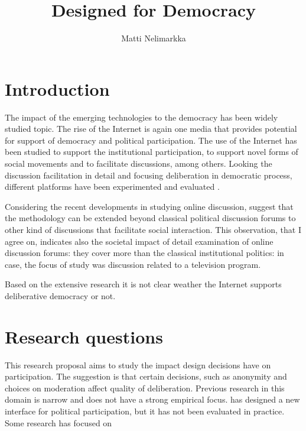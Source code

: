 \documentclass[journal,a4paper]{IEEEtran}
\author{Matti Nelimarkka}
\title{Designed for Democracy}
\begin{document}
\maketitle

\setlength{\parindent}{0pt}
\setlength{\parskip}{1ex}


\section{Introduction}

The impact of the emerging technologies to the democracy has been widely studied topic. The rise of the Internet is again one media that provides potential for support of democracy and political participation. The use of the Internet has been studied to support the institutional participation, to support novel forms of social movements and to facilitate discussions, among others. Looking the discussion facilitation in detail and focusing deliberation in democratic process, different platforms have been experimented  and evaluated .

Considering the recent developments in studying online discussion,  suggest that the methodology can be extended beyond classical political discussion forums to other kind of discussions that facilitate social interaction. This observation, that I agree on, indicates also the societal impact of detail examination of online discussion forums: they cover more than the classical institutional politics: in  case, the focus of study was discussion related to a television program.

Based on the extensive research it is not clear weather the Internet supports deliberative democracy or not.

\section{Research questions}

This research proposal aims to study the impact design decisions have on participation. The suggestion is that certain decisions, such as anonymity and choices on moderation affect quality of deliberation. Previous research in this domain is narrow and does not have a strong empirical focus.  has designed a new interface for political participation, but it has not been evaluated in practice.  Some research has focused on
\end{document}
